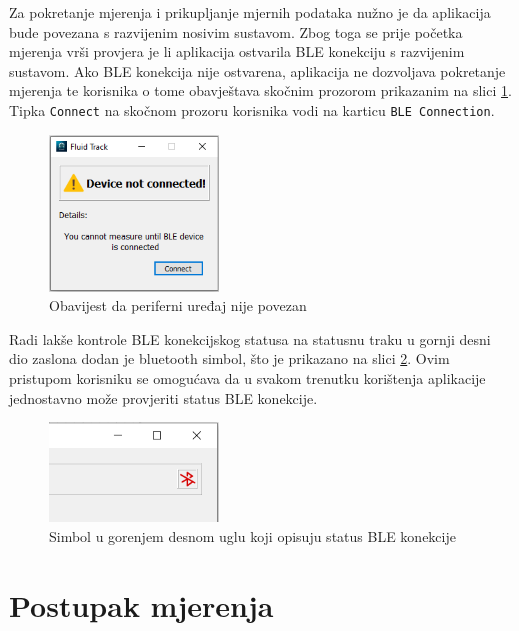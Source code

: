 \documentclass[../diplomski_rad.tex]{subfiles}
\begin{document}
Za pokretanje mjerenja i prikupljanje mjernih podataka nužno je da aplikacija bude povezana s razvijenim nosivim sustavom. 
Zbog toga se prije početka mjerenja vrši provjera je li aplikacija ostvarila BLE konekciju s razvijenim sustavom. 
Ako BLE konekcija nije ostvarena, aplikacija ne dozvoljava pokretanje mjerenja te korisnika o tome obavještava 
skočnim prozorom prikazanim na slici \ref{slk:ble_not_connected}. Tipka \texttt{Connect} na skočnom prozoru korisnika 
vodi na karticu \texttt{BLE Connection}.

\begin{figure}[htb]
    \centering
    \includegraphics[width=0.4\textwidth]{Figures/ble_not_connected.png} 
    \caption{Obavijest da periferni uređaj nije povezan}
    \label{slk:ble_not_connected}
\end{figure}

Radi lakše kontrole BLE konekcijskog statusa na statusnu traku u gornji desni dio zaslona dodan je bluetooth simbol, 
što je prikazano na slici \ref{slk:ble_status}.  
Ovim pristupom korisniku se omogućava da u svakom trenutku korištenja aplikacije jednostavno može provjeriti status BLE konekcije. 

\begin{figure}[htb]
    \centering
    \includegraphics[width=0.4\textwidth]{Figures/cosak.png} 
    \caption{Simbol u gorenjem desnom uglu koji opisuju status BLE konekcije}
    \label{slk:ble_status}
\end{figure}

\section{Postupak mjerenja}
\end{document}
